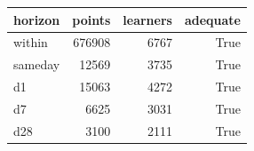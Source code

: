 \begin{tabular}{lrrr}
\toprule
horizon & points & learners & adequate \\
\midrule
within & 676908 & 6767 & True \\
sameday & 12569 & 3735 & True \\
d1 & 15063 & 4272 & True \\
d7 & 6625 & 3031 & True \\
d28 & 3100 & 2111 & True \\
\bottomrule
\end{tabular}
